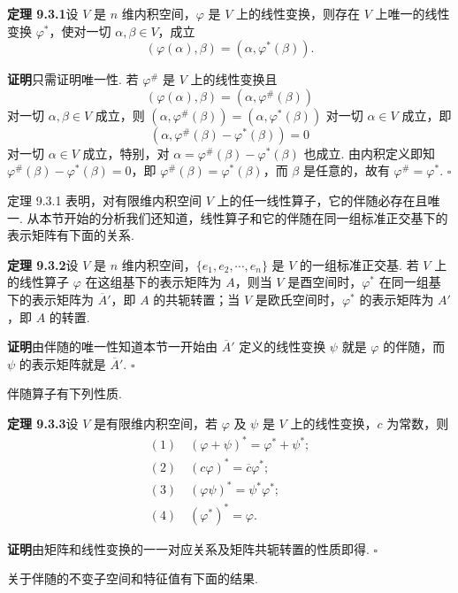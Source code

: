 \documentclass[UTF8, 12pt, fontset=fandol, oneside]{ctexart}
\begin{document}
\noindent\textbf{定理 9.3.1}\quad 设 $V$ 是 $n$ 维内积空间，$\varphi$ 是 $V$ 上的线性变换，则存在 $V$ 上唯一的线性变换 $\varphi^*$，使对一切 $\alpha,\beta\in V$，成立
\begin{equation}
  (\varphi(\alpha),\beta)=(\alpha,\varphi^*(\beta)).
  \tag{9.3.2}
\end{equation}

\noindent\textbf{证明}\quad 只需证明唯一性. 若 $\varphi^\#$ 是 $V$ 上的线性变换且
\[
  (\varphi(\alpha),\beta)=(\alpha,\varphi^\#(\beta))
\]
对一切 $\alpha,\beta\in V$ 成立，则 $(\alpha,\varphi^\#(\beta))=(\alpha,\varphi^*(\beta))$ 对一切 $\alpha\in V$ 成立，即
\[
  (\alpha,\varphi^\#(\beta)-\varphi^*(\beta))=0
\]
对一切 $\alpha\in V$ 成立，特别，对 $\alpha=\varphi^\#(\beta)-\varphi^*(\beta)$ 也成立. 由内积定义即知 $\varphi^\#(\beta)-\varphi^*(\beta)=0$，即 $\varphi^\#(\beta)=\varphi^*(\beta)$，而 $\beta$ 是任意的，故有 $\varphi^\#=\varphi^*$. $\square$

定理 9.3.1 表明，对有限维内积空间 $V$ 上的任一线性算子，它的伴随必存在且唯一. 从本节开始的分析我们还知道，线性算子和它的伴随在同一组标准正交基下的表示矩阵有下面的关系.

\noindent\textbf{定理 9.3.2}\quad 设 $V$ 是 $n$ 维内积空间，$\{e_1,e_2,\cdots,e_n\}$ 是 $V$ 的一组标准正交基. 若 $V$ 上的线性算子 $\varphi$ 在这组基下的表示矩阵为 $A$，则当 $V$ 是酉空间时，$\varphi^*$ 在同一组基下的表示矩阵为 $\overline A'$，即 $A$ 的共轭转置；当 $V$ 是欧氏空间时，$\varphi^*$ 的表示矩阵为 $A'$，即 $A$ 的转置.

\noindent\textbf{证明}\quad 由伴随的唯一性知道本节一开始由 $\overline A'$ 定义的线性变换 $\psi$ 就是 $\varphi$ 的伴随，而 $\psi$ 的表示矩阵就是 $\overline A'$. $\square$

伴随算子有下列性质.

\noindent\textbf{定理 9.3.3}\quad 设 $V$ 是有限维内积空间，若 $\varphi$ 及 $\psi$ 是 $V$ 上的线性变换，$c$ 为常数，则
\[
\begin{gathered}
  (1)\quad (\varphi+\psi)^*=\varphi^*+\psi^*;\\
  (2)\quad (c\varphi)^*=\overline c\varphi^*;\\
  (3)\quad (\varphi\psi)^*=\psi^*\varphi^*;\\
  (4)\quad (\varphi^*)^*=\varphi.
\end{gathered}
\]

\noindent\textbf{证明}\quad 由矩阵和线性变换的一一对应关系及矩阵共轭转置的性质即得. $\square$

关于伴随的不变子空间和特征值有下面的结果.
\end{document}
